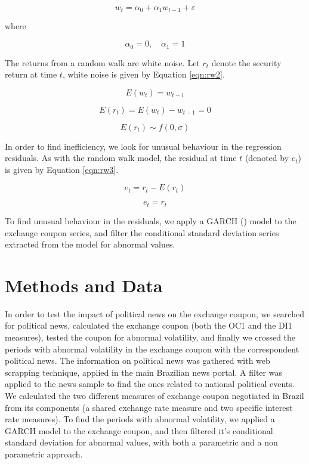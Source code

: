 \documentclass[cic,tc, english]{iiufrgs}
\begin{document}
    \begin{equation}
        \label{eqn:rw1}
        w_t = \alpha_0 + \alpha_1 w_{t-1} + \varepsilon
    \end{equation}

    where

    $$\alpha_0 = 0, \quad \alpha_1 = 1$$

    The returns from a random walk are white noise. Let $r_{t}$ denote the security return at time $t$, white noise is given by Equation \ref{eqn:rw2}.
    
    $$E(w_{t}) = w_{t-1}$$
    
    $$E(r_{t}) = E(w_{t}) - w_{t-1} = 0$$
    
    \begin{equation}
        \label{eqn:rw2}
        E(r_{t}) \sim f(0, \sigma)
    \end{equation}

    In order to find inefficiency, we look for unusual behaviour in the regression residuals. As with the random walk model, the residual at time $t$ (denoted by $e_t$) is given by Equation \ref{eqn:rw3}.

    $$e_t = r_t - E(r_t)$$

    \begin{equation}
        \label{eqn:rw3}
        e_t = r_t
    \end{equation}

    To find unusual behaviour in the residuals, we apply a GARCH (\citet{bollerslev1986}) model to the exchange coupon series, and filter the conditional standard deviation series extracted from the model for abnormal values.
    

\chapter{Methods and Data} \label{chapter_methods_data}

    In order to test the impact of political news on the exchange coupon, we searched for political news, calculated the exchange coupon (both the OC1 and the DI1 measures), tested the coupon for abnormal volatility, and finally we crossed the periods with abnormal volatility in the exchange coupon with the correspondent political news. The information on political news was gathered with web scrapping technique, applied in the main Brazilian news portal. A filter was applied to the news sample to find the ones related to national political events. We calculated the two different measures of exchange coupon negotiated in Brazil from its components (a shared exchange rate measure and two specific interest rate measures). To find the periods with abnormal volatility, we applied a GARCH model to the exchange coupon, and then filtered it's conditional standard deviation for abnormal values, with both a parametric and a non parametric approach.
\end{document}
